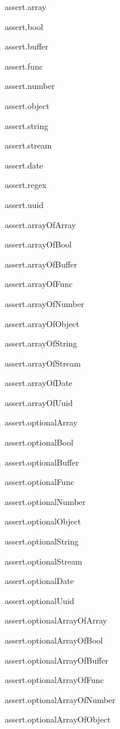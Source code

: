 \begin{DoxyItemize}
\item assert.\+array
\item assert.\+bool
\item assert.\+buffer
\item assert.\+func
\item assert.\+number
\item assert.\+object
\item assert.\+string
\item assert.\+stream
\item assert.\+date
\item assert.\+regex
\item assert.\+uuid
\item assert.\+array\+Of\+Array
\item assert.\+array\+Of\+Bool
\item assert.\+array\+Of\+Buffer
\item assert.\+array\+Of\+Func
\item assert.\+array\+Of\+Number
\item assert.\+array\+Of\+Object
\item assert.\+array\+Of\+String
\item assert.\+array\+Of\+Stream
\item assert.\+array\+Of\+Date
\item assert.\+array\+Of\+Uuid
\item assert.\+optional\+Array
\item assert.\+optional\+Bool
\item assert.\+optional\+Buffer
\item assert.\+optional\+Func
\item assert.\+optional\+Number
\item assert.\+optional\+Object
\item assert.\+optional\+String
\item assert.\+optional\+Stream
\item assert.\+optional\+Date
\item assert.\+optional\+Uuid
\item assert.\+optional\+Array\+Of\+Array
\item assert.\+optional\+Array\+Of\+Bool
\item assert.\+optional\+Array\+Of\+Buffer
\item assert.\+optional\+Array\+Of\+Func
\item assert.\+optional\+Array\+Of\+Number
\item assert.\+optional\+Array\+Of\+Object

\end{DoxyItemize}
